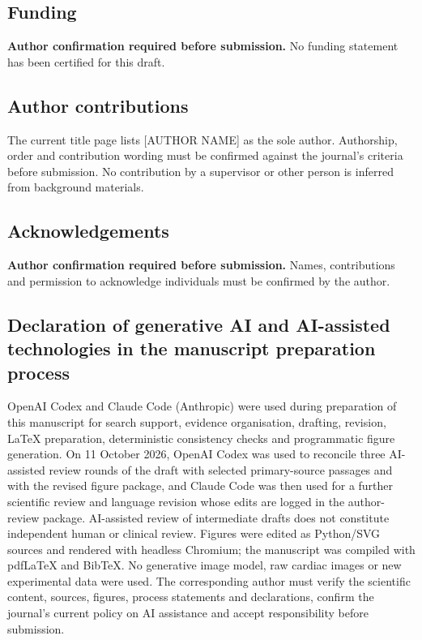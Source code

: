 \documentclass[11pt,a4paper]{article}
\begin{document}
\subsection*{Funding}
\textbf{Author confirmation required before submission.} No funding statement has been certified for this draft.

\subsection*{Author contributions}
The current title page lists [AUTHOR NAME] as the sole author. Authorship, order and contribution wording must be confirmed against the journal's criteria before submission. No contribution by a supervisor or other person is inferred from background materials.

\subsection*{Acknowledgements}
\textbf{Author confirmation required before submission.} Names, contributions and permission to acknowledge individuals must be confirmed by the author.

\subsection*{Declaration of generative AI and AI-assisted technologies in the manuscript preparation process}
OpenAI Codex and Claude Code (Anthropic) were used during preparation of this manuscript for search support, evidence organisation, drafting, revision, LaTeX preparation, deterministic consistency checks and programmatic figure generation. On 11 October 2026, OpenAI Codex was used to reconcile three AI-assisted review rounds of the draft with selected primary-source passages and with the revised figure package, and Claude Code was then used for a further scientific review and language revision whose edits are logged in the author-review package. AI-assisted review of intermediate drafts does not constitute independent human or clinical review. Figures were edited as Python/SVG sources and rendered with headless Chromium; the manuscript was compiled with pdfLaTeX and BibTeX. No generative image model, raw cardiac images or new experimental data were used. The corresponding author must verify the scientific content, sources, figures, process statements and declarations, confirm the journal's current policy on AI assistance and accept responsibility before submission.
\end{document}
